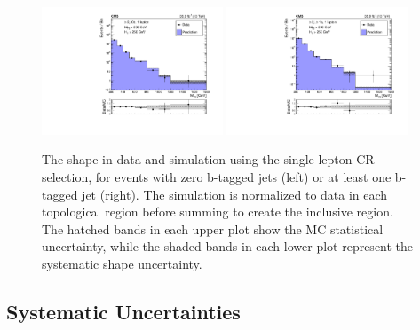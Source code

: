 \begin{figure}
	\centering
	\includegraphics[width=0.48\textwidth]{backgrounds/figs/lostlepHybrid_0b_mt2bins.pdf}
	\includegraphics[width=0.48\textwidth]{backgrounds/figs/lostlepHybrid_ge1b_mt2bins}
	\renewcommand{\baselinestretch}{1.0}
	\caption[The \mttwo shape in data and simulation using the single lepton CR selection, for events with zero b-tagged jets (left) or at least one b-tagged jet (right).]{The \mttwo shape in data and simulation using the single lepton CR selection, for events with zero b-tagged jets (left) or at least one b-tagged jet (right). The simulation is normalized to data in each topological region before summing to create the inclusive region. The hatched bands in each upper plot show the MC statistical uncertainty, while the shaded bands in each lower plot represent the systematic shape uncertainty.}
	\label{fig:lostlepHybrid}
\end{figure}

\subsection{Systematic Uncertainties}
\label{subsec:lostlepSyst}

